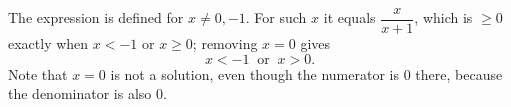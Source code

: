 The expression is defined for $x\ne0,-1$. For such $x$ it equals $\dfrac x{x+1}$, which is $\ge0$ exactly when $x<-1$ or $x\ge0$; removing $x=0$ gives
\[\boxed{x<-1\ \text{ or }\ x>0}.\]
Note that $x=0$ is not a solution, even though the numerator is $0$ there, because the denominator is also $0$.

